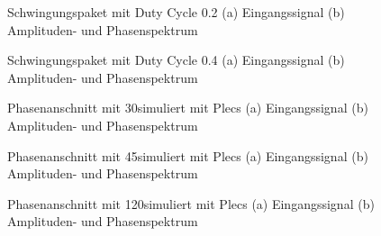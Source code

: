 \begin{appendix}
\newpage

\begin{figure}[ht!]
	\centering
	\qquad
	\caption{Schwingungspaket mit Duty Cycle 0.2 (a) Eingangssignal (b) Amplituden- und Phasenspektrum}
	\label{fig:Schwingungspaketsteuerung_mit_duty_cycle_0_2}
\end{figure}


\begin{figure}[ht!]
	\centering
	\qquad
	\caption{Schwingungspaket mit Duty Cycle 0.4 (a) Eingangssignal (b) Amplituden- und Phasenspektrum}
	\label{fig:Schwingungspaketsteuerung_mit_duty_cycle_0_4}
\end{figure}

\begin{figure}[ht!]
	\centering
	\qquad
	\caption{Phasenanschnitt mit 30\textdegree simuliert mit Plecs (a) Eingangssignal (b) Amplituden- und Phasenspektrum}
	\label{fig:Plecs_mit_phasenanschnitt_30}
\end{figure}

\newpage

\begin{figure}[ht!]
	\centering
	\qquad
	\caption{Phasenanschnitt mit 45\textdegree simuliert mit Plecs (a) Eingangssignal (b) Amplituden- und Phasenspektrum}
	\label{fig:Plecs_mit_phasenanschnitt_45}
\end{figure}


\begin{figure}[ht!]
	\centering
	\qquad
	\caption{Phasenanschnitt mit 120\textdegree simuliert mit Plecs (a) Eingangssignal (b) Amplituden- und Phasenspektrum}
	\label{fig:Plecs_mit_phasenanschnitt_120}
\end{figure}



\end{appendix}
